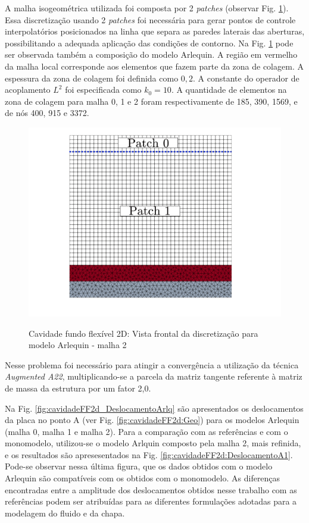 \documentclass[tese_patricia]{subfiles}
\begin{document}
A malha isogeométrica utilizada foi composta por 2 \textit{patches} (observar Fig. \ref{fig:cavidadeFF2d:Malhas}). Essa discretização usando 2 \textit{patches} foi necessária para gerar pontos de controle interpolatórios posicionados na linha que separa as paredes laterais das aberturas, possibilitando a adequada aplicação das condições de contorno. Na Fig. \ref{fig:cavidadeFF2d:Malhas} pode ser observada também a composição do modelo Arlequin. A região em vermelho da malha local corresponde aos elementos que fazem parte da zona de colagem.  A espessura da zona de colagem foi definida como $0,2$. A constante do operador de acoplamento $L^{2}$ foi especificada como $k_{0} = 10$. A quantidade de elementos na zona de colagem para malha 0, 1 e 2  foram respectivamente de 185, 390, 1569, e de nós 400, 915 e 3372.

\begin{figure}[htb!]
	\centering
	{\includegraphics[scale=0.2,trim=0cm 2cm 0cm 0cm, clip=true]{Imagens/Cap7/Cav2dMesh.pdf}} 
	\caption{Cavidade fundo flexível 2D: Vista frontal da discretização para modelo Arlequin - malha 2}
	\label{fig:cavidadeFF2d:Malhas}
\end{figure}


Nesse problema foi necessário para atingir a convergência a utilização da técnica \textit{Augmented A22}, multiplicando-se a parcela da matriz tangente referente à matriz de massa da estrutura por um fator 2,0.

Na Fig. \ref{fig:cavidadeFF2d_DeslocamentoArlq} são apresentados os deslocamentos da placa no ponto A (ver Fig. \ref{fig:cavidadeFF2d:Geo}) para os modelos Arlequin (malha 0, malha 1 e malha 2). Para a comparação com as referências e com o monomodelo, utilizou-se o modelo Arlquin composto pela malha 2, mais refinida, e os resultados são apresesentados na Fig. \ref{fig:cavidadeFF2d:DeslocamentoA1}. Pode-se observar nessa última figura, que os dados obtidos com o modelo Arlequin são compatíveis com os obtidos com o monomodelo. As diferenças encontradas entre a amplitude dos deslocamentos obtidos nesse trabalho com as referências podem ser atribuídas para as diferentes formulações adotadas para a modelagem do fluido e da chapa.
\end{document}
